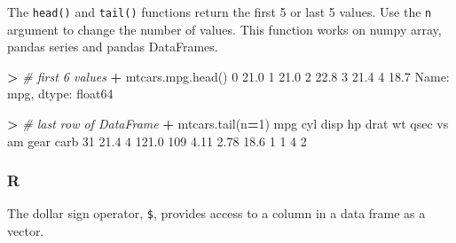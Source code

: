 \documentclass[
]{book}
\newenvironment{Shaded}{\begin{snugshade}}{\end{snugshade}}
\newcommand{\CommentTok}[1]{\textcolor[rgb]{0.56,0.35,0.01}{\textit{#1}}}
\newcommand{\DecValTok}[1]{\textcolor[rgb]{0.00,0.00,0.81}{#1}}
\newcommand{\FloatTok}[1]{\textcolor[rgb]{0.00,0.00,0.81}{#1}}
\newcommand{\NormalTok}[1]{#1}
\newcommand{\OperatorTok}[1]{\textcolor[rgb]{0.81,0.36,0.00}{\textbf{#1}}}
\newcommand{\SpecialCharTok}[1]{\textcolor[rgb]{0.00,0.00,0.00}{#1}}
\begin{document}
The \texttt{head()} and \texttt{tail()} functions return the first 5 or last 5 values. Use the \texttt{n} argument to change the number of values. This function works on numpy array, pandas series and pandas DataFrames.

\begin{Shaded}
\begin{Highlighting}[]
\OperatorTok{\textgreater{}} \CommentTok{\# first 6 values}
\OperatorTok{+}\NormalTok{ mtcars.mpg.head()}
\DecValTok{0}    \FloatTok{21.0}
\DecValTok{1}    \FloatTok{21.0}
\DecValTok{2}    \FloatTok{22.8}
\DecValTok{3}    \FloatTok{21.4}
\DecValTok{4}    \FloatTok{18.7}
\NormalTok{Name: mpg, dtype: float64}
\end{Highlighting}
\end{Shaded}

\begin{Shaded}
\begin{Highlighting}[]
\OperatorTok{\textgreater{}} \CommentTok{\# last row of DataFrame}
\OperatorTok{+}\NormalTok{ mtcars.tail(n}\OperatorTok{=}\DecValTok{1}\NormalTok{)}
\NormalTok{     mpg  cyl   disp   hp  drat    wt  qsec  vs  am  gear  carb}
\DecValTok{31}  \FloatTok{21.4}    \DecValTok{4}  \FloatTok{121.0}  \DecValTok{109}  \FloatTok{4.11}  \FloatTok{2.78}  \FloatTok{18.6}   \DecValTok{1}   \DecValTok{1}     \DecValTok{4}     \DecValTok{2}
\end{Highlighting}
\end{Shaded}

\hypertarget{r-15}{%
\subsubsection*{R}\label{r-15}}

The dollar sign operator, \texttt{\$}, provides access to a column in a data frame as a vector.

\begin{Shaded}
\end{Shaded}
\end{document}
